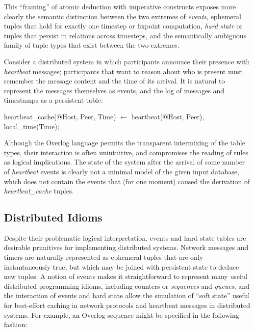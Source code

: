 This ``framing'' of atomic deduction with imperative constructs exposes more clearly the 
semantic distinction between the two extremes of \emph{events}, ephemeral tuples that 
hold for exactly one timestep or fixpoint computation, \emph{hard state} or tuples that 
persist in relations across timesteps, and the semantically ambiguous family of tuple types
that exist between the two extremes. 

Consider a distributed system in which participants announce their presence with 
\emph{heartbeat} messages; participants that want to reason about who is present must
remember the message content and the time of its arrival.  It is natural to represent the messages 
themselves as events, and the log of messages and timestamps as a persistent table:

\begin{Dedalus}
heartbeat\_cache(@Host, Peer, Time) \(\leftarrow\) 
  heartbeat(@Host, Peer), local\_time(Time);
\end{Dedalus}

 Although the Overlog language permits the transparent
intermixing of the table types, their interaction is often unintuitive, and compromises the
reading of rules as logical implications.  The state of the system after the arrival of some
number of \emph{heartbeat} events is clearly not a minimal model of the given input database,
which does not contain the events that (for one moment) caused the derivation of 
\emph{heartbeat\_cache} tuples.




\subsection{Distributed Idioms}

Despite their problematic logical interpretation, events and hard state tables are desirable 
primitives for implementing distributed systems.  Network messages and timers are naturally represented as ephemeral tuples that are only instantaneously true, but which may be joined 
with persistent state to deduce new tuples.  A notion of events makes it straightforward to
represent many useful distributed programming idioms, including counters or \emph{sequences} and \emph{queues}, and the interaction of events and hard state allow the simulation of ``soft state'' useful for best-effort caching in network protocols and heartbeat messages in distributed systems.  For example,  an Overlog sequence might be specified in the following fashion:

